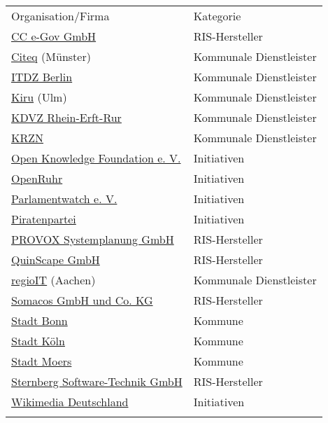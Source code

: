 \documentclass[,a4paper]{article}
\begin{document}
\begin{longtable}[c]{@{}ll@{}}
\toprule\addlinespace
Organisation/Firma & Kategorie
\\\addlinespace
\midrule\endhead
\href{http://www.cc-egov.de/}{CC e-Gov GmbH} & RIS-Hersteller
\\\addlinespace
\href{http://www.citeq.de/}{Citeq} (Münster) & Kommunale Dienstleister
\\\addlinespace
\href{http://www.itdz-berlin.de/}{ITDZ Berlin} & Kommunale Dienstleister
\\\addlinespace
\href{http://www.rz-kiru.de/}{Kiru} (Ulm) & Kommunale Dienstleister
\\\addlinespace
\href{http://www.kdvz-frechen.de/}{KDVZ Rhein-Erft-Rur} & Kommunale
Dienstleister
\\\addlinespace
\href{http://www.krzn.de/}{KRZN} & Kommunale Dienstleister
\\\addlinespace
\href{http://okfn.de/}{Open Knowledge Foundation e. V.} & Initiativen
\\\addlinespace
\href{http://openruhr.de/}{OpenRuhr} & Initiativen
\\\addlinespace
\href{http://www.abgeordnetenwatch.de/}{Parlamentwatch e. V.} &
Initiativen
\\\addlinespace
\href{http://www.piratenpartei.de/}{Piratenpartei} & Initiativen
\\\addlinespace
\href{http://www.provox.de/}{PROVOX Systemplanung GmbH} & RIS-Hersteller
\\\addlinespace
\href{http://www.quinscape.de/}{QuinScape GmbH} & RIS-Hersteller
\\\addlinespace
\href{http://www.regioit-aachen.de/}{regioIT} (Aachen) & Kommunale
Dienstleister
\\\addlinespace
\href{http://www.somacos.de/}{Somacos GmbH und Co. KG} & RIS-Hersteller
\\\addlinespace
\href{http://www.bonn.de/}{Stadt Bonn} & Kommune
\\\addlinespace
\href{http://www.stadt-koeln.de/}{Stadt Köln} & Kommune
\\\addlinespace
\href{http://www.moers.de/}{Stadt Moers} & Kommune
\\\addlinespace
\href{http://www.sitzungsdienst.net/}{Sternberg Software-Technik GmbH} &
RIS-Hersteller
\\\addlinespace
\href{http://www.wikimedia.de/}{Wikimedia Deutschland} & Initiativen
\\\addlinespace
\bottomrule
\end{longtable}
\end{document}

